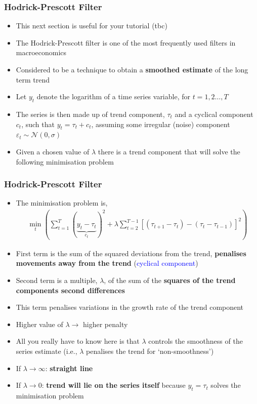 \documentclass[10pt, handout]{beamer} %
\begin{document}
\begin{frame}
\frametitle{Hodrick-Prescott Filter}
\begin{itemize}[<+->]
\item This next section is useful for your tutorial (tbc)
\item The Hodrick-Prescott filter is one of the most frequently used filters in macroeconomics
\item Considered to be a technique to obtain a \textbf{smoothed estimate} of the long term trend
\item Let $y_t$ denote the logarithm of a time series variable, for $t = 1,2 \ldots, T$
\item The series is then made up of trend component, $\tau_{t}$ and a cyclical component $c_{t}$, such that $y_{t} = \tau_{t} + c_{t}$, assuming some irregular (noise) component $\varepsilon_{t} \sim \mathcal{N}(0,\sigma)$
\item Given a chosen value of $\lambda$ there is a trend component that will solve the following minimisation problem
\end{itemize}
\end{frame}

\begin{frame}
\frametitle{Hodrick-Prescott Filter}
\small
\begin{itemize}[<+->]
\item The minimisation problem is,
\begin{align*}
\min_{t}\left(\sum_{t=1}^{T}(\underset{c_t}{\underbrace{y_{t} - \tau_{t}}})^{2} + \lambda\sum_{t=2}^{T-1}\left[(\tau_{t+1} - \tau_{t}) - (\tau_{t} - \tau_{t-1})\right]^{2}\right)
\end{align*}
\item First term is the sum of the squared deviations from the trend, \textbf{penalises movements away from the trend} (\textcolor{blue}{cyclical component})
\item Second term is a multiple, $\lambda$, of the sum of the \textbf{squares of the trend components second differences}
\item This term penalises variations in the growth rate of the trend component
\item Higher value of $\lambda \rightarrow$ higher penalty
\item All you really have to know here is that $\lambda$ controls the smoothness of the series estimate (i.e., $\lambda$ penalises the trend for `non-smoothness')
\item If $\lambda \rightarrow \infty$: \textbf{straight line}
\item If $\lambda \rightarrow 0$: \textbf{trend will lie on the series itself} because $y_{t} = \tau_{t}$ solves the minimisation problem
\end{itemize}
\end{frame}
\end{document}
